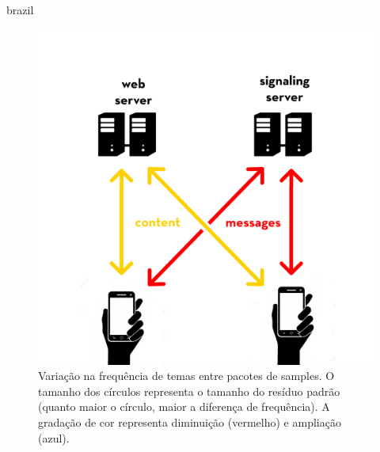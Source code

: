 \begin{otherlanguage*}{brazil}

\begin{figure}
\centering
\includegraphics[width=1\linewidth]{pictures/server.jpg}
\caption{Variação na frequência de temas entre pacotes de samples. O tamanho dos círculos representa o tamanho do resíduo padrão (quanto maior o círculo, maior a diferença de frequência). A gradação de cor representa diminuição (vermelho) e ampliação (azul).}
\label{fig:bblplot2}
\end{figure}


\end{otherlanguage*}
